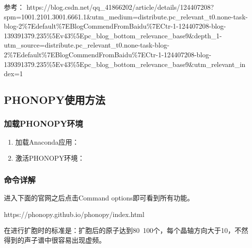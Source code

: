







参考：
https://blog.csdn.net/qq\_41866202/article/details/124407208?spm=1001.2101.3001.6661.1\&utm\_medium=distribute.pc\_relevant\_t0.none-task-blog-2\%7Edefault\%7EBlogCommendFromBaidu\%7ECtr-1-124407208-blog-139391379.235\%5Ev43\%5Epc\_blog\_bottom\_relevance\_base9\&depth\_1-utm\_source=distribute.pc\_relevant\_t0.none-task-blog-2\%7Edefault\%7EBlogCommendFromBaidu\%7ECtr-1-124407208-blog-139391379.235\%5Ev43\%5Epc\_blog\_bottom\_relevance\_base9\&utm\_relevant\_index=1

\subsection{PHONOPY使用方法}\label{sec:计算软件PHONOPY-PHONOPY使用方法}

\subsubsection{加载PHONOPY环境}
\begin{enumerate}
    \item 加载Anaconda应用：
    \item 激活PHONOPY环境：
\end{enumerate}

\subsubsection{命令详解}

进入下面的官网之后点击Command options即可看到所有功能。

https://phonopy.github.io/phonopy/index.html 

\begin{attention}
 在进行扩胞时的标准是：扩胞后的原子达到80~100个，每个晶轴方向大于10，不然得到的声子谱中很容易出现虚频。
\end{attention}